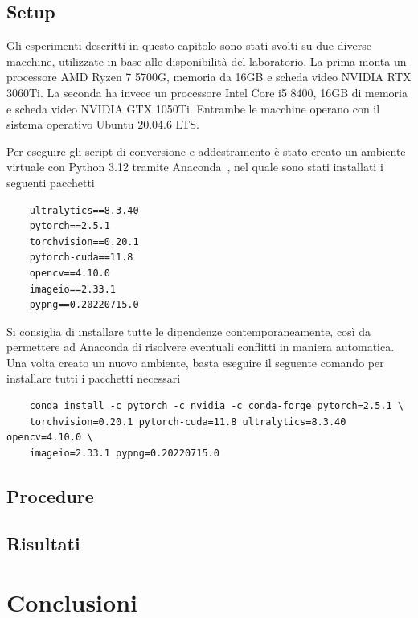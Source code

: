 \documentclass[12pt]{report}
\begin{document}
\section{Setup}
\label{sec:setup}

Gli esperimenti descritti in questo capitolo sono stati svolti su due diverse macchine, utilizzate in base alle disponibilità del laboratorio. La prima monta un processore AMD Ryzen 7 5700G, memoria da 16GB e scheda video NVIDIA RTX 3060Ti. La seconda ha invece un processore Intel Core i5 8400, 16GB di memoria e scheda video NVIDIA GTX 1050Ti. Entrambe le macchine operano con il sistema operativo Ubuntu 20.04.6 LTS.

Per eseguire gli script di conversione e addestramento è stato creato un ambiente virtuale con Python 3.12 tramite Anaconda~\cite{anaconda}, nel quale sono stati installati i seguenti pacchetti

\begin{verbatim}
	ultralytics==8.3.40
	pytorch==2.5.1
	torchvision==0.20.1
	pytorch-cuda==11.8
	opencv==4.10.0
	imageio==2.33.1
	pypng==0.20220715.0
\end{verbatim}

Si consiglia di installare tutte le dipendenze contemporaneamente, così da permettere ad Anaconda di risolvere eventuali conflitti in maniera automatica. Una volta creato un nuovo ambiente, basta eseguire il seguente comando per installare tutti i pacchetti necessari

\begin{verbatim}
	conda install -c pytorch -c nvidia -c conda-forge pytorch=2.5.1 \
	torchvision=0.20.1 pytorch-cuda=11.8 ultralytics=8.3.40 opencv=4.10.0 \
	imageio=2.33.1 pypng=0.20220715.0
\end{verbatim}

\section{Procedure}
\label{sec:procedure}

\section{Risultati}
\label{sec:risultati}

\chapter{Conclusioni}
\label{chap:conclusioni}
\end{document}
